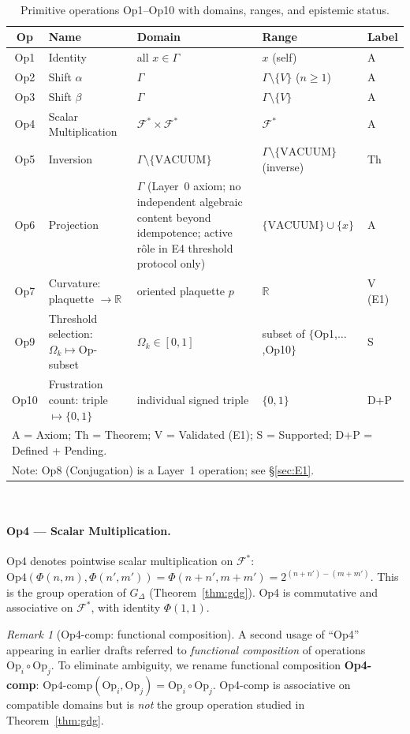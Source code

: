 \documentclass[12pt,a4paper]{article}
\theoremstyle{plain}
\theoremstyle{definition}
\theoremstyle{remark}
\newtheorem{remark}[theorem]{Remark}
\begin{document}
\begin{table}[htbp]
\caption{Primitive operations Op1--Op10 with domains, ranges, and epistemic status.}
\label{tab:ops}
\
\small
\begin{tabular}{clp{4.5cm}p{3.5cm}l}
\toprule
Op & Name & Domain & Range & Label \\
\midrule
Op1 & Identity & all $x\in\Gamma$ & $x$ (self) & A \\
Op2 & Shift $\alpha$ & $\Gamma$ & $\Gamma\setminus\{V\}$ ($n\geq 1$) & A \\
Op3 & Shift $\beta$ & $\Gamma$ & $\Gamma\setminus\{V\}$ & A \\
Op4 & Scalar Multiplication & $\mathcal{F}^* \times \mathcal{F}^*$ & $\mathcal{F}^*$ & A \\
Op5  & Inversion
  & $\Gamma\setminus\{\mathrm{VACUUM}\}$
  & $\Gamma\setminus\{\mathrm{VACUUM}\}$ (inverse)
  & Th \\
Op6  & Projection
  & $\Gamma$ (Layer~0 axiom; no independent algebraic content
    beyond idempotence; active rôle in E4 threshold protocol only)
  & $\{\mathrm{VACUUM}\}\cup\{x\}$
  & A \\
Op7  & Curvature: plaquette $\to\mathbb{R}$
  & oriented plaquette $p$
  & $\mathbb{R}$
  & V (E1) \\
Op9  & Threshold selection: $\Omega_k\mapsto\mathrm{Op}$-subset
  & $\Omega_k\in[0,1]$
  & subset of $\{$Op1,$\ldots$,Op10$\}$
  & S \\
Op10 & Frustration count: triple $\mapsto\{0,1\}$
  & individual signed triple
  & $\{0,1\}$
  & D+P \\
\bottomrule
\multicolumn{5}{l}{\small A = Axiom; Th = Theorem; V = Validated (E1); S = Supported; D+P = Defined + Pending.} \\
\multicolumn{5}{l}{\small Note: Op8 (Conjugation) is a Layer~1 operation; see \S\ref{sec:E1}.}
\end{tabular}
\
\end{table}

\paragraph{Op4 --- Scalar Multiplication.}
Op4 denotes pointwise scalar multiplication on $\mathcal{F}^*$:
$\mathrm{Op4}(\Phi(n,m), \Phi(n',m')) = \Phi(n{+}n', m{+}m') = 2^{(n+n')-(m+m')}$.
This is the group operation of $G_\Delta$ (Theorem~\ref{thm:gdg}).
Op4 is commutative and associative on $\mathcal{F}^*$, with identity $\Phi(1,1)$.

\begin{remark}[Op4-comp: functional composition]\label{rem:op4comp}
A second usage of ``Op4'' appearing in earlier drafts referred to
\emph{functional composition} of operations
$\mathrm{Op}_i \circ \mathrm{Op}_j$.
To eliminate ambiguity, we rename functional composition
\textbf{Op4-comp}: $\mathrm{Op4\text{-}comp}(\mathrm{Op}_i, \mathrm{Op}_j)
= \mathrm{Op}_i \circ \mathrm{Op}_j$.
Op4-comp is associative on compatible domains but is \emph{not}
the group operation studied in Theorem~\ref{thm:gdg}.
\end{remark}
\end{document}
